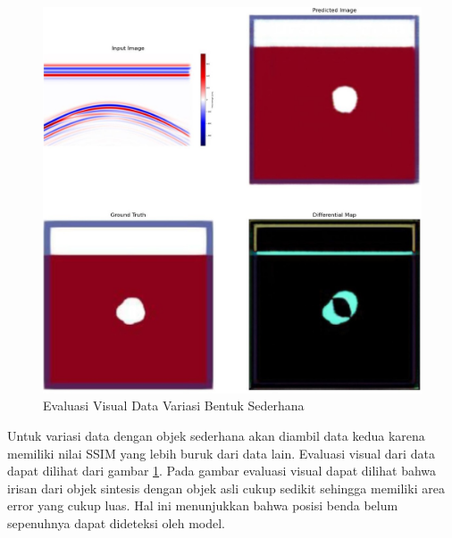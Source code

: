 \documentclass[conference]{IEEEtran}
\begin{document}
\begin{figure}[ht]
  \centering
  \includegraphics[scale=0.15]{gambar/diffMapSederhana.jpg}
  \caption{Evaluasi Visual Data Variasi Bentuk Sederhana}
  \label{fig:diffmapsederhana}
\end{figure}

Untuk variasi data dengan objek sederhana akan diambil data kedua karena memiliki nilai SSIM yang lebih buruk dari data lain. 
Evaluasi visual dari data dapat dilihat dari gambar \ref{fig:diffmapsederhana}.
Pada gambar evaluasi visual dapat dilihat bahwa irisan dari objek sintesis dengan objek asli cukup sedikit sehingga memiliki area error yang cukup luas. 
Hal ini menunjukkan bahwa posisi benda belum sepenuhnya dapat dideteksi oleh model.
\end{document}
